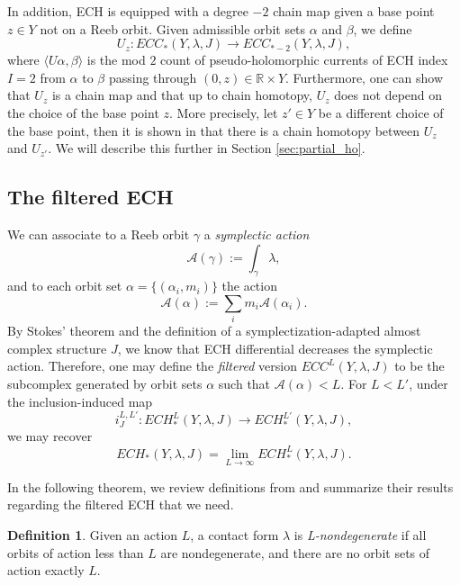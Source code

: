 \documentclass{article}
\numberwithin{equation}{section}
\theoremstyle{definition}
\newtheorem{definition}[theorem]{Definition}
\newcommand{\R}{\mathbb{R}}
\begin{document}
In addition, ECH is equipped with a degree $-2$ chain map given a base point $z\in Y$ not on a Reeb orbit. Given admissible orbit sets $\alpha$ and $\beta$, we define
$$U_z: ECC_*(Y, \lambda, J) \longrightarrow ECC_{*-2}(Y, \lambda, J),$$
where $\langle U\alpha, \beta\rangle$ is the mod $2$ count of pseudo-holomorphic currents of ECH index $I=2$ from $\alpha$ to $\beta$ passing through $(0,z)\in \R \times Y$. Furthermore, one can show that $U_z$ is a chain map and that up to chain homotopy, $U_z$ does not depend on the choice of the base point $z$. More precisely, let $z'\in Y$ be a different choice of the base point, then it is shown in \cite{HT_weinstein} that there is a chain homotopy between $U_z$ and $U_{z'}$. We will describe this further in Section \ref{sec:partial_ho}.



\subsection{The filtered ECH}
\label{sec:filtered_ECH}
We can associate to a Reeb orbit $\gamma$ a \emph{symplectic action} 
$$\mathcal{A}(\gamma) := \int_\gamma \lambda,$$
and to each orbit set $\alpha = \{(\alpha_i, m_i)\}$ the action
$$\mathcal{A}(\alpha) := \sum_i m_i \mathcal{A}(\alpha_i).$$ 
By Stokes' theorem and the definition of a symplectization-adapted almost complex structure $J$, we know that ECH differential decreases the symplectic action. Therefore, one may define the \emph{filtered} version $ECC^L(Y,\lambda, J)$ to be the subcomplex generated by orbit sets $\alpha$ such that $\mathcal{A}(\alpha)<L$. For $L<L'$, under the inclusion-induced map
$$i_J^{L,L'}:ECH_*^L(Y, \lambda, J) \longrightarrow ECH_*^{L'}(Y,\lambda, J),$$
we may recover
\begin{equation}
\label{eq:direct_lim_J}
    ECH_*(Y,\lambda, J) = \lim_{L\to \infty} ECH_*^L(Y,\lambda, J).
\end{equation}



In the following theorem, we review definitions from \cite{HT_Chord_II} and summarize their results regarding the filtered ECH that we need.

\begin{definition}
Given an action $L$, a contact form $\lambda$ is \emph{L-nondegenerate} if all orbits of action less than $L$ are nondegenerate, and there are no orbit sets of action exactly $L$.
\end{definition}
\end{document}
